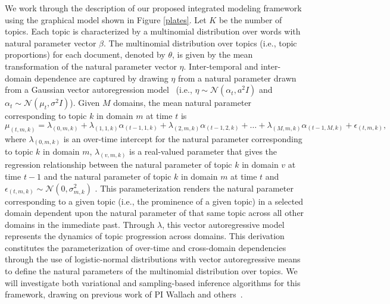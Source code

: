 We work through the description of our proposed integrated modeling
framework using the graphical model shown in Figure \ref{plates}. Let
$K$ be the number of topics. Each topic is characterized by a
multinomial distribution over words with natural parameter vector
$\beta$. The multinomial distribution over topics (i.e., topic
proportions) for each document, denoted by $\theta$, is given by the
mean transformation of the natural parameter vector
$\eta$. Inter-temporal and inter-domain dependence are captured by
drawing $\eta$ from a natural parameter drawn from a Gaussian vector
autoregression
model~\cite{Banbura2010} (i.e., $\eta \sim
\mathcal{N}\left(\alpha_t,a^2I \right)$ and $\alpha_t \sim
\mathcal{N}(\mu_t,\sigma^2I)$). Given $M$ domains, the mean natural
parameter corresponding to topic $k$ in domain $m$ at time $t$ is $$
\mu_{(t,m,k)} = \lambda_{(0,m,k)} +
\lambda_{(1,1,k)}\alpha_{(t-1,1,k)}+
\lambda_{(2,m,k)}\alpha_{(t-1,2,k)}+\hdots+\lambda_{(M,m,k)}\alpha_{(t-1,M,k)}+\epsilon_{(t,m,k)},$$
where $ \lambda_{(0,m,k)}$ is an over-time intercept for the natural
parameter corresponding to topic $k$ in domain $m$,
$\lambda_{(v,m,k)}$ is a real-valued parameter that gives the
regression relationship between the natural parameter of topic $k$ in
domain $v$ at time $t-1$ and the natural parameter of topic $k$ in
domain $m$ at time $t$ and $\epsilon_{(t,m,k)} \sim
\mathcal{N}(0,\sigma^2_{m,k})$ . This parameterization renders the
natural parameter corresponding to a given topic (i.e., the prominence
of a given topic) in a selected domain dependent upon the natural
parameter of that same topic across all other domains in the immediate
past. Through $\lambda$, this vector autoregressive model represents
the dynamics of topic progression across domains.  This derivation
constitutes the parameterization of over-time and cross-domain
dependencies through the use of logistic-normal distributions
\cite{Blei2006} with vector autoregressive means to define the natural
parameters of the multinomial distribution over topics. We will
investigate both variational and sampling-based inference algorithms
for this framework, drawing on previous work of PI Wallach and
others~\cite{Blei2006, Mimno08}.


